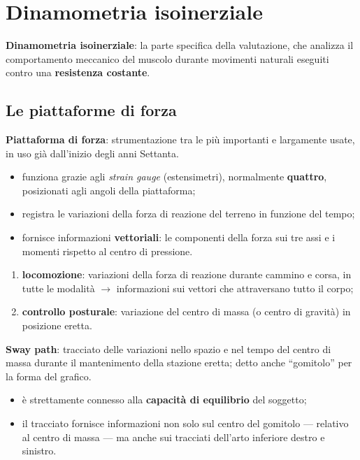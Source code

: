 \chapter{Dinamometria isoinerziale}

\textbf{Dinamometria isoinerziale}: la parte specifica della valutazione, che analizza il
  comportamento meccanico del muscolo durante movimenti naturali eseguiti contro una
  \textbf{resistenza costante}.

\section{Le piattaforme di forza}

\textbf{Piattaforma di forza}: strumentazione tra le più importanti e largamente usate, in uso già
dall'inizio degli anni Settanta.

\begin{itemize}
  \item funziona grazie agli \textit{strain gauge} (estensimetri), normalmente \textbf{quattro},
    posizionati agli angoli della piattaforma;
  \item registra le variazioni della forza di reazione del terreno in funzione del tempo;
  \item fornisce informazioni \textbf{vettoriali}: le componenti della forza sui tre assi e i
    momenti rispetto al centro di pressione.
\end{itemize}

\begin{enumerate}
  \item \textbf{locomozione}: variazioni della forza di reazione durante cammino e corsa, in tutte
    le modalità $\rightarrow$ informazioni sui vettori che attraversano tutto il corpo;
  \item \textbf{controllo posturale}: variazione del centro di massa (o centro di gravità) in
    posizione eretta.
\end{enumerate}

\textbf{Sway path}: tracciato delle variazioni nello spazio e nel tempo del centro di massa durante
il mantenimento della stazione eretta; detto anche ``gomitolo'' per la forma del grafico.
\begin{itemize}
  \item è strettamente connesso alla \textbf{capacità di equilibrio} del soggetto;
  \item il tracciato fornisce informazioni non solo sul centro del gomitolo --- relativo al centro
    di
    massa --- ma anche sui tracciati dell'arto inferiore destro e sinistro.
\end{itemize}

